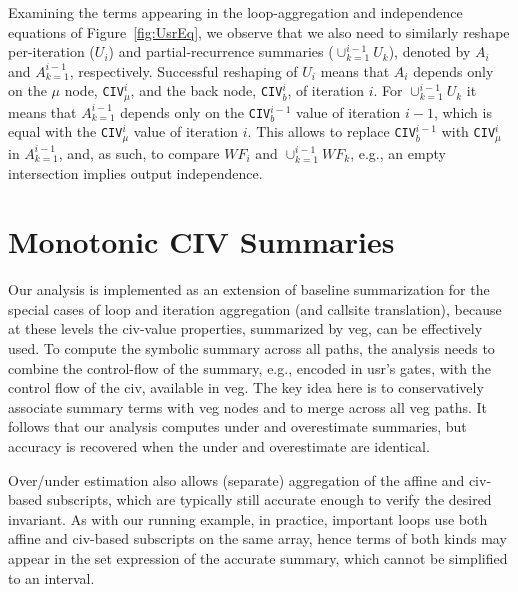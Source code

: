 \documentclass{sig-alternate}
\begin{document}
%
Examining the terms appearing in the loop-aggregation and independence 
equations of Figure~\ref{fig:UsrEq}, we observe that we also need to similarly
reshape per-iteration ($U_i$) and partial-recurrence summaries 
($\cup_{k=1}^{i-1} U_k$), 
denoted by $A_i$ and $A_{k=1}^{i-1}$, respectively. 
%
Successful reshaping of $U_i$ means that $A_i$
depends only on the $\mu$ node, {\tt CIV}$_{\mu}^{i}$, 
and the back node, {\tt CIV}$_{b}^{i}$, of iteration $i$.
For $\cup_{k=1}^{i-1} U_k$ it means that $A_{k=1}^{i-1}$ depends
only on the {\tt CIV}$_{b}^{i-1}$ value of iteration $i-1$, which is
equal with the  {\tt CIV}$_{\mu}^{i}$ value of iteration $i$.
This allows to replace {\tt CIV}$_b^{i-1}$ with {\tt CIV}$_{\mu}^i$ in
$A_{k=1}^{i-1}$, and, as such, to compare $WF_i$ and $\cup_{k=1}^{i-1} WF_k$, 
e.g., an empty intersection implies output independence. 
%


\section{Monotonic CIV Summaries}
\label{sec:MonotonicCiv}


Our analysis is implemented as an extension of baseline 
summarization for the special cases of loop and iteration 
aggregation (and callsite translation), because at these 
levels the {\sc civ}-value properties, summarized by 
{\sc veg}, can be effectively used.
%
To compute the symbolic summary across all paths, the analysis
needs to combine the control-flow of the summary, e.g., 
encoded in {\sc usr}'s gates, with the control flow of the 
{\sc civ}, available in {\sc veg}. 
The key idea here is to conservatively 
associate summary terms with {\sc veg} nodes
and to merge across all {\sc veg} paths.
It follows that our analysis computes under and overestimate
summaries, but accuracy is recovered when the under and 
overestimate are identical.
%

Over/under estimation also allows (separate) aggregation of the 
affine and {\sc civ}-based subscripts, which are typically
still accurate enough to verify the desired invariant.
%
%
As with our running example, in practice, important loops use both %
affine and {\sc civ}-based subscripts on the same array, hence 
terms of both kinds may appear in the set expression %
of the accurate summary, which cannot be simplified
to an interval.
\end{document}
